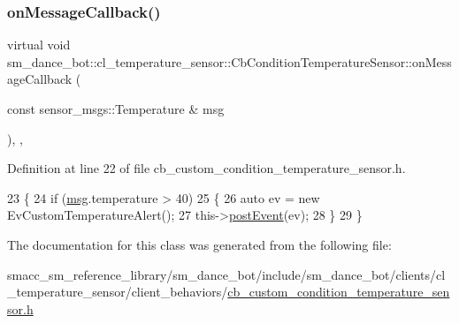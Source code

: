 \subsubsection{\texorpdfstring{on\+Message\+Callback()}{onMessageCallback()}}
{\footnotesize\ttfamily virtual void sm\+\_\+dance\+\_\+bot\+::cl\+\_\+temperature\+\_\+sensor\+::\+Cb\+Condition\+Temperature\+Sensor\+::on\+Message\+Callback (\begin{DoxyParamCaption}\item[{const sensor\+\_\+msgs\+::\+Temperature \&}]{msg }\end{DoxyParamCaption})\hspace{0.3cm}{\ttfamily [inline]}, {\ttfamily [override]}, {\ttfamily [virtual]}}



Definition at line 22 of file cb\+\_\+custom\+\_\+condition\+\_\+temperature\+\_\+sensor.\+h.


\begin{DoxyCode}
23   \{
24     \textcolor{keywordflow}{if} (\hyperlink{namespacebattery__monitor__node_ab1920c64448816edd4064e494275fdff}{msg}.temperature > 40)
25     \{
26       \textcolor{keyword}{auto} ev = \textcolor{keyword}{new} EvCustomTemperatureAlert();
27       this->\hyperlink{classsmacc_1_1ISmaccClientBehavior_a5db577c585935114058770f2b7242f8a}{postEvent}(ev);
28     \}
29   \}
\end{DoxyCode}


The documentation for this class was generated from the following file\+:\begin{DoxyCompactItemize}
\item 
smacc\+\_\+sm\+\_\+reference\+\_\+library/sm\+\_\+dance\+\_\+bot/include/sm\+\_\+dance\+\_\+bot/clients/cl\+\_\+temperature\+\_\+sensor/client\+\_\+behaviors/\hyperlink{sm__dance__bot_2include_2sm__dance__bot_2clients_2cl__temperature__sensor_2client__behaviors_2cb15a3861006d3511ad9c098b2b40e8300}{cb\+\_\+custom\+\_\+condition\+\_\+temperature\+\_\+sensor.\+h}\end{DoxyCompactItemize}
